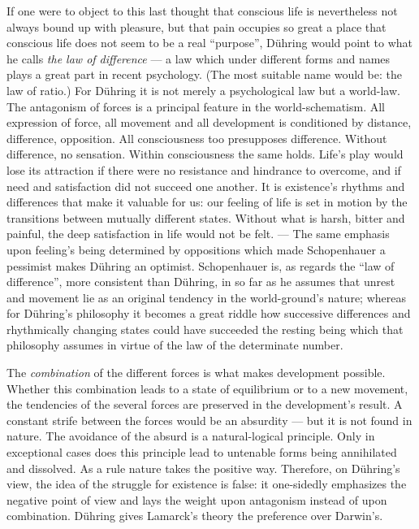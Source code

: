 \documentclass[12pt,a4paper]{book}
\newcommand{\opage}[1]{\marginnote{\footnotesize\textit{[#1]}}}
\begin{document}
If one were to object to this last thought that conscious life is nevertheless
not always bound up with pleasure, but that pain occupies so great a place that
conscious life does not seem to be a real ``purpose'', Dühring would point to
what he calls \emph{the law of difference} --- a law which under different forms
and names plays a great part in recent psychology. (The most suitable name would
be: the law of ratio.) For Dühring it is not merely a psychological law but a
world-law. The antagonism of forces is a principal feature in the
world-schematism. All expression of force, all movement and all development is
conditioned by distance, difference, opposition. All consciousness too
presupposes difference. Without difference, no sensation. Within consciousness
the same holds. Life's play would lose its attraction if there were no resistance
and hindrance to overcome, and if need and satisfaction did not succeed one
another. It is existence's rhythms and differences that make it valuable for us:
our feeling of life is set in motion by the transitions between mutually
different states. Without what is harsh, bitter and painful, the deep
satisfaction in life would not be felt. --- The same emphasis upon feeling's
being determined by oppositions which made Schopenhauer a pessimist makes Dühring
an optimist. Schopenhauer is, as regards the ``law of difference'', more
consistent than Dühring, in so far as he assumes that unrest and movement lie as
an original tendency in the world-ground's nature; whereas for Dühring's
philosophy it becomes a great riddle how successive differences and rhythmically
changing states could have succeeded the resting being which that philosophy
assumes in virtue of the law of the determinate number.

The \emph{combination} of the different forces is what makes development
possible. Whether this combination leads to a state of equilibrium or to a new
movement, the tendencies of the several forces are preserved in the development's
result. A constant strife between the forces would be an absurdity --- but it is
\opage{564}not found in nature. The avoidance of the absurd is a natural-logical principle.
Only in exceptional cases does this principle lead to untenable forms being
annihilated and dissolved. As a rule nature takes the positive way. Therefore, on
Dühring's view, the idea of the struggle for existence is false: it one-sidedly
emphasizes the negative point of view and lays the weight upon antagonism instead
of upon combination. Dühring gives Lamarck's theory the preference over Darwin's.
\end{document}
